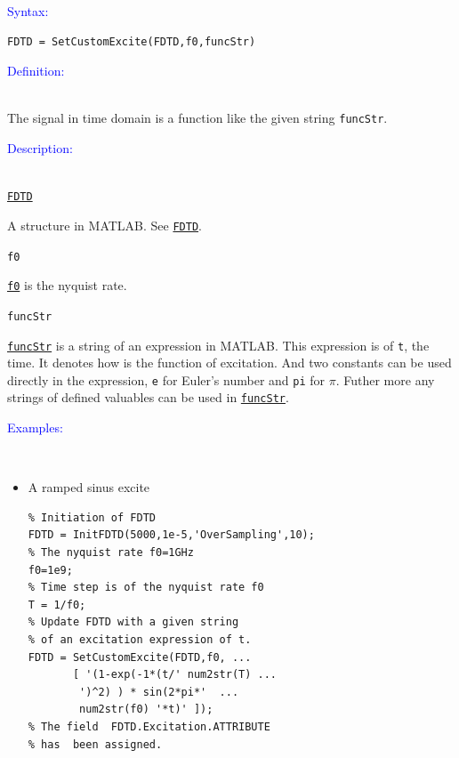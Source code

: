 \textcolor{blue}{\begin{large}Syntax:\end{large}}
 \begin{lstlisting}
FDTD = SetCustomExcite(FDTD,f0,funcStr)
 \end{lstlisting}

\textcolor{blue}{\begin{large}Definition:\end{large}}\\
      The signal in time domain is a function like the given string \texttt{funcStr}.

\textcolor{blue}{\begin{large}Description:\end{large}}\\
	\hyperref[para:FDTD]{\texttt{FDTD}} 
	    \begin{myindentpar}
		A structure in MATLAB. See \hyperref[para:FDTD]{\texttt{FDTD}}.
	    \end{myindentpar}
	\texttt{f0}   \label{para:custom_f0} %
	    \begin{myindentpar}
		\hyperref[para:f0]{\texttt{f0}}  is the nyquist rate. 
	    \end{myindentpar}
	\texttt{funcStr}   \label{para:custom_funcStr} %
	    \begin{myindentpar}
		\hyperref[para:custom_funcStr]{\texttt{funcStr}}   is a string of an expression in MATLAB. This expression is of \texttt{t}, the time. It denotes how is the function of excitation.  And two constants can be used directly in the expression, \texttt{e} for Euler's number and \texttt{pi} for $\pi$. Futher more any strings of defined valuables can be used in \hyperref[para:custom_funcStr]{\texttt{funcStr}}.
	    \end{myindentpar}

	    \textcolor{blue}{\begin{large}Examples:\end{large}}\\
    \begin{itemize}
	\item A ramped sinus excite 
	\begin{lstlisting}
% Initiation of FDTD 
FDTD = InitFDTD(5000,1e-5,'OverSampling',10);
% The nyquist rate f0=1GHz
f0=1e9;
% Time step is of the nyquist rate f0
T = 1/f0;
% Update FDTD with a given string 
% of an excitation expression of t. 
FDTD = SetCustomExcite(FDTD,f0, ...
       [ '(1-exp(-1*(t/' num2str(T) ...
        ')^2) ) * sin(2*pi*'  ...
        num2str(f0) '*t)' ]);
% The field  FDTD.Excitation.ATTRIBUTE 
% has  been assigned.
	\end{lstlisting}
    \end{itemize}
